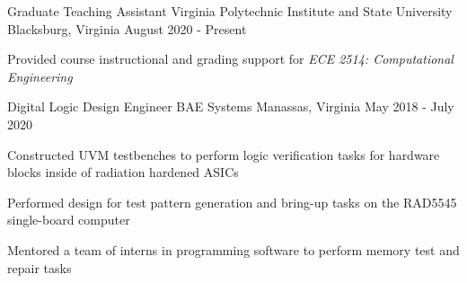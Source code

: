 


\begin{cventries}

\cventry
{Graduate Teaching Assistant} %
{Virginia Polytechnic Institute and State University} %
{Blacksburg, Virginia} %
{August 2020 - Present} %
{ %
\begin{cvitems}
\item {Provided course instructional and grading support for \textit{ECE 2514: Computational Engineering}}
\end{cvitems}
}


\cventry
{Digital Logic Design Engineer} %
{BAE Systems} %
{Manassas, Virginia} %
{May 2018 - July 2020} %
{ %
\begin{cvitems}
\item {Constructed UVM testbenches to perform logic verification tasks for hardware blocks inside of radiation hardened ASICs}
\item {Performed design for test pattern generation and bring-up tasks on the RAD5545 single-board computer}
\item {Mentored a team of interns in programming software to perform memory test and repair tasks}
\end{cvitems}
}


\end{cventries}
